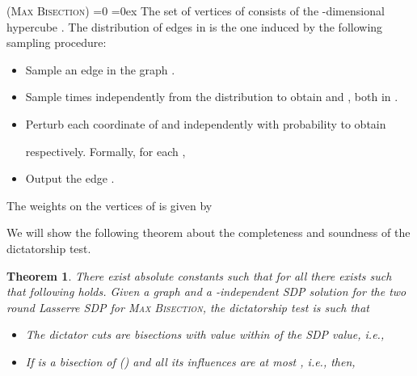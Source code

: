 \documentclass[11pt]{article}
\def\full{1}
\newtheorem{theorem}{Theorem}[section]
\theoremstyle{definition}
\newenvironment{mybox}
{\center \noindent\begin{boxedminipage}{1.0\linewidth}}
{\end{boxedminipage}
\noindent
}
\newcommand{\problemmacro}[1]{\texorpdfstring{\textsc{#1}}{#1}\xspace}
\newcommand{\maxbisection}{\problemmacro{Max Bisection}}
\numberwithin{equation}{section}
\begin{document}
	\begin{mybox}
 (\maxbisection)
\ifnum\full=0
\itemsep=0ex
\fi
The set of vertices of  consists of the
-dimensional hypercube .  The distribution of edges in
 is the one induced by the following sampling
procedure:
\begin{itemize} \itemsep=0ex
\item Sample an edge  in the graph .
\item Sample  times independently from the distribution  to
	obtain  and
	, both in
	.
\item  Perturb each coordinate of  and 
	independently with probability  to obtain
	
	respectively.  Formally, for each ,
	
\item Output the edge . \end{itemize}
The weights on the vertices of  is given by

\end{mybox}

  We will show the following theorem about the completeness and
soundness of the dictatorship test.

\begin{theorem} \label{thm:gaptodict}
There exist absolute constants  such that for all  there exists  such that following holds. Given a graph  and a
-independent SDP solution   for the two round Lasserre SDP for \maxbisection, the
dictatorship test  is such that
\begin{itemize}
	\item The {\it dictator cuts} are bisections with value within
		 of the SDP value, i.e.,
		
	\item If  is a bisection of
		 () and all its influences are at most , i.e.,
		 then,
		
\end{itemize}
\end{theorem}
\end{document}
